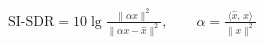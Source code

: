 \documentclass[border=10pt]{standalone}
\begin{document}
$\displaystyle \mathrm{SI\text{-}SDR} = 10\lg\frac{\lVert\alpha x\rVert^2}{\lVert\alpha x - \hat{x}\rVert^2},\qquad \alpha = \frac{\langle \hat{x},\,x\rangle}{\lVert x\rVert^2}$
\end{document}
